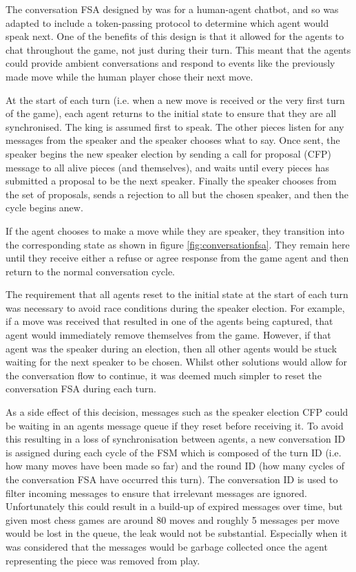\documentclass{article}
\begin{document}
The conversation FSA designed by \cite{tartan} was for a human-agent chatbot, and so was adapted to include a token-passing protocol to determine which agent would speak next. One of the benefits of this design is that it allowed for the agents to chat throughout the game, not just during their turn. This meant that the agents could provide ambient conversations and respond to events like the previously made move while the human player chose their next move.

At the start of each turn (i.e. when a new move is received or the very first turn of the game), each agent returns to the initial state to ensure that they are all synchronised. The king is assumed first to speak. The other pieces listen for any messages from the speaker and the speaker chooses what to say. Once sent, the speaker begins the new speaker election by sending a call for proposal (CFP) message to all alive pieces (and themselves), and waits until every pieces has submitted a proposal to be the next speaker. Finally the speaker chooses from the set of proposals, sends a rejection to all but the chosen speaker, and then the cycle begins anew.

If the agent chooses to make a move while they are speaker, they transition into the corresponding state as shown in figure \ref{fig:conversationfsa}. They remain here until they receive either a refuse or agree response from the game agent and then return to the normal conversation cycle. 

The requirement that all agents reset to the initial state at the start of each turn was necessary to avoid race conditions during the speaker election. For example, if a move was received that resulted in one of the agents being captured, that agent would immediately remove themselves from the game. However, if that agent was the speaker during an election, then all other agents would be stuck waiting for the next speaker to be chosen. Whilst other solutions would allow for the conversation flow to continue, it was deemed much simpler to reset the conversation FSA during each turn.

As a side effect of this decision, messages such as the speaker election CFP could be waiting in an agents message queue if they reset before receiving it. To avoid this resulting in a loss of synchronisation between agents, a new conversation ID is assigned during each cycle of the FSM which is composed of the turn ID (i.e. how many moves have been made so far) and the round ID (how many cycles of the conversation FSA have occurred this turn). The conversation ID is used to filter incoming messages to ensure that irrelevant messages are ignored. Unfortunately this could result in a build-up of expired messages over time, but given most chess games are around 80 moves \cite{chessdata} and roughly 5 messages per move would be lost in the queue, the leak would not be substantial. Especially when it was considered that the messages would be garbage collected once the agent representing the piece was removed from play.
\end{document}
